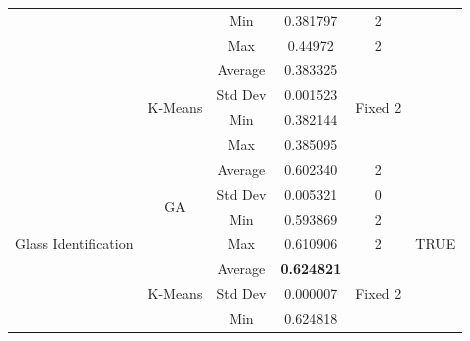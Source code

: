\documentclass[journal]{IEEEtran}
\begin{document}
\begin{table}[]
\begin{tabular}{|c|c|c|c|c|c|}
			&                               & Min                            & 0.381797                    & 2                        &                       \\ \cline{3-5}
			&                               & Max                            & 0.44972                     & 2                        &                       \\ \cline{2-5}
			& \multirow{4}{*}{K-Means}      & Average                        & 0.383325                    & \multirow{4}{*}{Fixed 2} &                       \\ \cline{3-4}
			&                               & Std Dev                        & 0.001523                    &                          &                       \\ \cline{3-4}
			&                               & Min                            & 0.382144                    &                          &                       \\ \cline{3-4}
			&                               & Max                            & 0.385095                    &                          &                       \\ \hline
			\multirow{8}{*}{Glass Identification}  & \multirow{4}{*}{GA}           & Average                        & 0.602340                    & 2                        & \multirow{8}{*}{TRUE} \\ \cline{3-5}
			&                               & Std Dev                        & 0.005321                    & 0                        &                       \\ \cline{3-5}
			&                               & Min                            & 0.593869                    & 2                        &                       \\ \cline{3-5}
			&                               & Max                            & 0.610906                    & 2                        &                       \\ \cline{2-5}
			& \multirow{4}{*}{K-Means}      & Average                        & \textbf{0.624821}                    & \multirow{4}{*}{Fixed 2} &                       \\ \cline{3-4}
			&                               & Std Dev                        & 0.000007                    &                          &                       \\ \cline{3-4}
			&                               & Min                            & 0.624818                    &                          &                       \\ \cline{3-4}

\end{tabular}
\end{table}
\end{document}
